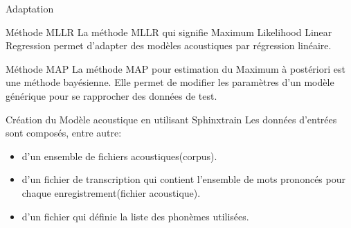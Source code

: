 \begin{frame}{Adaptation}
\begin{block}{Méthode MLLR}
La méthode MLLR qui signifie Maximum Likelihood Linear Regression permet d’adapter des modèles acoustiques par régression linéaire.
\end{block}
\begin{block}{Méthode MAP}
La méthode MAP pour estimation du Maximum à postériori est une méthode bayésienne. Elle permet de modifier les paramètres d’un modèle générique pour se rapprocher des données de test.
\end{block}

\end{frame}

\begin{frame}{Création du Modèle acoustique en utilisant Sphinxtrain}
Les données d'entrées sont composés, entre autre:
\begin{itemize}
\item d'un ensemble de fichiers acoustiques(corpus).
\item d'un fichier de transcription qui contient l'ensemble de mots prononcés pour chaque enregistrement(fichier acoustique).
\item d'un fichier qui définie la liste des phonèmes utilisées.
\end{itemize}
\end{frame}